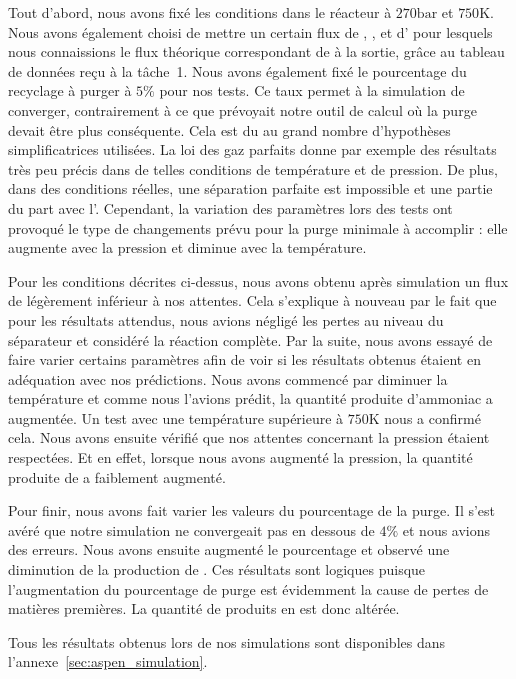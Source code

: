 \documentclass[a4paper, oneside, 12pt]{article}
\begin{document}
Tout d'abord, nous avons fixé les conditions dans le réacteur à $270\si{\bar}$ 
et $750\si{\kelvin}$. 
Nous avons également choisi de mettre un certain flux de , , et d'  
pour lesquels nous connaissions le flux théorique correspondant de  à la sortie,
grâce au tableau de données reçu à la tâche~1. 
Nous avons également fixé le pourcentage du recyclage à purger à $5\%$ pour nos tests.
Ce taux permet à la simulation de converger, contrairement à ce que prévoyait 
notre outil de calcul où la purge devait être plus conséquente. 
Cela est du au grand nombre d'hypothèses simplificatrices utilisées. 
La loi des gaz parfaits donne par exemple des résultats très peu précis 
dans de telles conditions de température et de pression. 
De plus, dans des conditions réelles, 
une séparation parfaite est impossible et une partie du  part avec l'.
Cependant, la variation des paramètres lors des tests ont provoqué 
le type de changements prévu pour la purge minimale à accomplir : 
elle augmente avec la pression et diminue avec la température.

Pour les conditions décrites ci-dessus, 
nous avons obtenu après simulation un flux de  légèrement inférieur à nos attentes. 
Cela s'explique à nouveau par le fait que pour les résultats attendus, 
nous avions négligé les pertes au niveau du séparateur et considéré la réaction complète.
Par la suite, nous avons essayé de faire varier certains paramètres afin 
de voir si les résultats obtenus étaient en adéquation avec nos prédictions. 
Nous avons commencé par diminuer la température et comme nous l'avions prédit, 
la quantité produite d'ammoniac a augmentée. 
Un test avec une température supérieure à $750\si{\kelvin}$ nous a confirmé cela. 
Nous avons ensuite vérifié que nos attentes concernant la pression étaient respectées. 
Et en effet, lorsque nous avons augmenté la pression, 
la quantité produite de  a faiblement augmenté.

Pour finir, nous avons fait varier les valeurs du pourcentage de la purge.
Il s'est avéré que notre simulation ne convergeait pas en dessous de $4\%$ 
et nous avions des erreurs.
Nous avons ensuite augmenté le pourcentage 
et observé une diminution de la production de . 
Ces résultats sont logiques puisque l'augmentation du pourcentage 
de purge est évidemment la cause de pertes de matières premières. 
La quantité de produits en est donc altérée.

Tous les résultats obtenus lors de nos simulations 
sont disponibles dans l'annexe~\ref{sec:aspen_simulation}.

\appendix


\printbibliography
\end{document}
